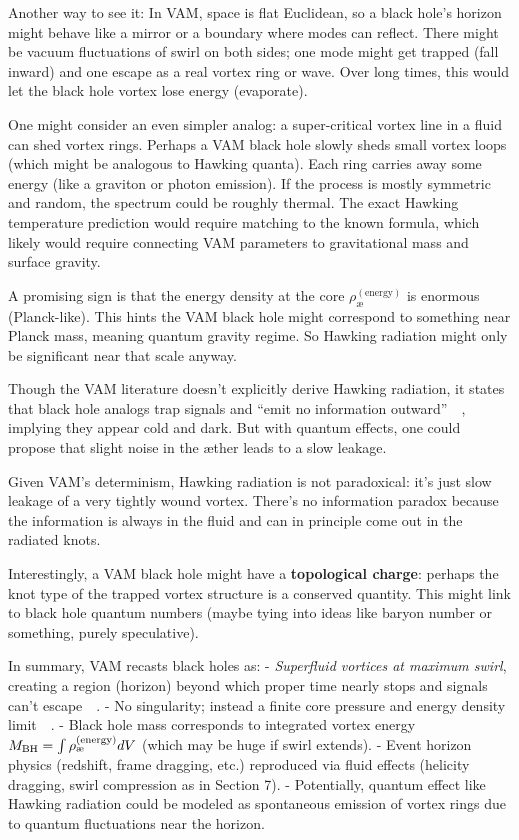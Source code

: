 \documentclass[a4paper,12pt]{article}
\begin{document}
    Another way to see it: In VAM, space is flat Euclidean, so a black hole’s horizon might behave like a mirror or a boundary where modes can reflect. There might be vacuum fluctuations of swirl on both sides; one mode might get trapped (fall inward) and one escape as a real vortex ring or wave. Over long times, this would let the black hole vortex lose energy (evaporate).

    One might consider an even simpler analog: a super-critical vortex line in a fluid can shed vortex rings. Perhaps a VAM black hole slowly sheds small vortex loops (which might be analogous to Hawking quanta). Each ring carries away some energy (like a graviton or photon emission). If the process is mostly symmetric and random, the spectrum could be roughly thermal. The exact Hawking temperature prediction would require matching to the known formula, which likely would require connecting VAM parameters to gravitational mass and surface gravity.

    A promising sign is that the energy density at the core $\rho_{\text{\ae}}^{(\text{energy})}$ is enormous (Planck-like). This hints the VAM black hole might correspond to something near Planck mass, meaning quantum gravity regime. So Hawking radiation might only be significant near that scale anyway.

    Though the VAM literature doesn’t explicitly derive Hawking radiation, it states that black hole analogs trap signals and “emit no information outward”~\cite{reference_133}~\cite{reference_134}, implying they appear cold and dark. But with quantum effects, one could propose that slight noise in the æther leads to a slow leakage.

    Given VAM’s determinism, Hawking radiation is not paradoxical: it’s just slow leakage of a very tightly wound vortex. There’s no information paradox because the information is always in the fluid and can in principle come out in the radiated knots.

    Interestingly, a VAM black hole might have a \textbf{topological charge}: perhaps the knot type of the trapped vortex structure is a conserved quantity. This might link to black hole quantum numbers (maybe tying into ideas like baryon number or something, purely speculative).

    In summary, VAM recasts black holes as:
    - \emph{Superfluid vortices at maximum swirl}, creating a region (horizon) beyond which proper time nearly stops and signals can’t escape~\cite{reference_135}~\cite{reference_136}.
    - No singularity; instead a finite core pressure and energy density limit~\cite{reference_137}~\cite{reference_138}.
    - Black hole mass corresponds to integrated vortex energy $M_{\rm BH} = \int \rho_{\text{\ae}}^{(\text{energy})} dV$ (which may be huge if swirl extends).
    - Event horizon physics (redshift, frame dragging, etc.) reproduced via fluid effects (helicity dragging, swirl compression as in Section 7).
    - Potentially, quantum effect like Hawking radiation could be modeled as spontaneous emission of vortex rings due to quantum fluctuations near the horizon.
\end{document}
